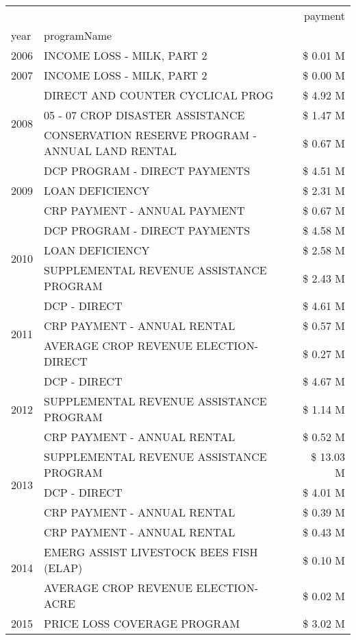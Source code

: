 \begin{tabular}{llr}
\toprule
 &  & payment \\
year & programName &  \\
\midrule
2006 & INCOME LOSS - MILK, PART 2 & \$ 0.01 M \\
\cline{1-3}
2007 & INCOME LOSS - MILK, PART 2 & \$ 0.00 M \\
\cline{1-3}
\multirow[t]{3}{*}{2008} & DIRECT AND COUNTER CYCLICAL PROG & \$ 4.92 M \\
 & 05 - 07 CROP DISASTER ASSISTANCE & \$ 1.47 M \\
 & CONSERVATION RESERVE PROGRAM - ANNUAL LAND RENTAL & \$ 0.67 M \\
\cline{1-3}
\multirow[t]{3}{*}{2009} & DCP PROGRAM - DIRECT PAYMENTS & \$ 4.51 M \\
 & LOAN DEFICIENCY & \$ 2.31 M \\
 & CRP PAYMENT - ANNUAL PAYMENT & \$ 0.67 M \\
\cline{1-3}
\multirow[t]{3}{*}{2010} & DCP PROGRAM - DIRECT PAYMENTS & \$ 4.58 M \\
 & LOAN DEFICIENCY & \$ 2.58 M \\
 & SUPPLEMENTAL REVENUE ASSISTANCE PROGRAM & \$ 2.43 M \\
\cline{1-3}
\multirow[t]{3}{*}{2011} & DCP - DIRECT & \$ 4.61 M \\
 & CRP PAYMENT - ANNUAL RENTAL & \$ 0.57 M \\
 & AVERAGE CROP REVENUE ELECTION-DIRECT & \$ 0.27 M \\
\cline{1-3}
\multirow[t]{3}{*}{2012} & DCP - DIRECT & \$ 4.67 M \\
 & SUPPLEMENTAL REVENUE ASSISTANCE PROGRAM & \$ 1.14 M \\
 & CRP PAYMENT - ANNUAL RENTAL & \$ 0.52 M \\
\cline{1-3}
\multirow[t]{3}{*}{2013} & SUPPLEMENTAL REVENUE ASSISTANCE PROGRAM & \$ 13.03 M \\
 & DCP - DIRECT & \$ 4.01 M \\
 & CRP PAYMENT - ANNUAL RENTAL & \$ 0.39 M \\
\cline{1-3}
\multirow[t]{3}{*}{2014} & CRP PAYMENT - ANNUAL RENTAL & \$ 0.43 M \\
 & EMERG ASSIST LIVESTOCK BEES FISH (ELAP) & \$ 0.10 M \\
 & AVERAGE CROP REVENUE ELECTION-ACRE & \$ 0.02 M \\
\cline{1-3}
\multirow[t]{3}{*}{2015} & PRICE LOSS COVERAGE PROGRAM & \$ 3.02 M \\

\end{tabular}

